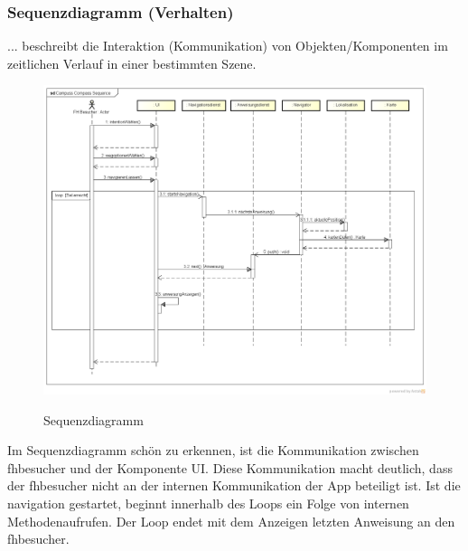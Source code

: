 \subsubsection*{Sequenzdiagramm (Verhalten)}
... beschreibt die Interaktion (Kommunikation) von Objekten/Komponenten im zeitlichen Verlauf in einer bestimmten Szene.

\begin{figure}[hbt]
  \centering
  \includegraphics[width=\linewidth]{img/sequenzdiagramm.png}
  \label{img:sequenzdiagramm}
  \caption{Sequenzdiagramm}
\end{figure}

\noindent Im Sequenzdiagramm schön zu erkennen, ist die Kommunikation zwischen \gls{fhbesucher} und der Komponente UI. Diese Kommunikation macht deutlich, dass der \gls{fhbesucher} nicht an der internen Kommunikation der App beteiligt ist. Ist die \gls{navigation} gestartet, beginnt innerhalb des Loops ein Folge von internen Methodenaufrufen. Der Loop endet mit dem Anzeigen letzten Anweisung an den \gls{fhbesucher}.